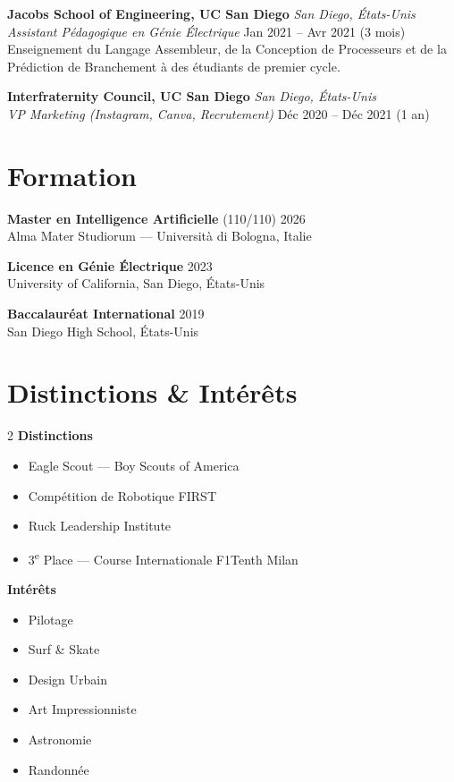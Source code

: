 \documentclass[11pt,a4paper]{article}
\begin{document}
\vspace{0.4em}
\newpage
\textbf{Jacobs School of Engineering, UC San Diego} \hfill \textit{San Diego, États-Unis}\\
\textit{Assistant Pédagogique en Génie Électrique} \hfill Jan 2021 -- Avr 2021 (3 mois)\\
Enseignement du Langage Assembleur, de la Conception de Processeurs et de la Prédiction de Branchement à des étudiants de premier cycle.

\vspace{0.4em}
\textbf{Interfraternity Council, UC San Diego} \hfill \textit{San Diego, États-Unis}\\
\textit{VP Marketing (Instagram, Canva, Recrutement)} \hfill Déc 2020 -- Déc 2021 (1 an)

\section{Formation}

\textbf{Master en Intelligence Artificielle} (110/110) \hfill 2026\\
Alma Mater Studiorum --- Università di Bologna, Italie

\vspace{0.3em}
\textbf{Licence en Génie Électrique} \hfill 2023\\
University of California, San Diego, États-Unis

\vspace{0.3em}
\textbf{Baccalauréat International} \hfill 2019\\
San Diego High School, États-Unis

\section{Distinctions \& Intérêts}

\begin{multicols}{2}
\textbf{Distinctions}
\begin{itemize}
  \item Eagle Scout --- Boy Scouts of America
  \item Compétition de Robotique FIRST\textregistered
  \item Ruck Leadership Institute
  \item 3\textsuperscript{e} Place --- Course Internationale F1Tenth Milan
\end{itemize}

\columnbreak
\textbf{Intérêts}
\begin{itemize}
  \item Pilotage
  \item Surf \& Skate
  \item Design Urbain
  \item Art Impressionniste
  \item Astronomie
  \item Randonnée
\end{itemize}
\end{multicols}
\end{document}
